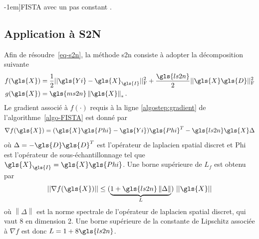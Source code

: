 \begin{algorithme}
    \begin{minipage}{\textwidth}
        \begin{algorithm}[H]
        \end{algorithm}
    \end{minipage}
    \caption[][-1em]{FISTA avec un pas constant \cite{beck_fast_2009}.\protect\label{algo-FISTA}}
\end{algorithme}

\subsection{Application à S2N}

Afin de résoudre~\eqref{eq-s2n}, la méthode \gls{s2n} consiste à adopter la décomposition suivante
\begin{align}
    f(\gls{X}) &= \frac{1}{2}\frobnorm{\gls{Yi}-\gls{X}_{\gls{I}}} + \frac{\gls{ls2n}}{2}\frobnorm{\gls{X} \gls{D}}\\
    g(\gls{X}) &= \gls{ms2n} \left\|\gls{X}\right\|_*.
\end{align}
Le gradient associé à $f(\cdot)$ requis à la ligne \ref{algostep:gradient} de l'algorithme~\ref{algo-FISTA} est donné par
\begin{equation}
    \label{nablaf-s2n}
    \nabla f(\gls{X}) = (\gls{X}\gls{Phi} - \gls{Yi})\gls{Phi}^T - \gls{ls2n} \gls{X} \Delta
\end{equation}
où $\Delta = -\gls{D}\gls{D}^T$ est l'opérateur de laplacien spatial discret et \gls{Phi} est l'opérateur de sous-échantillonnage tel que $\gls{X}_{\gls{I}} = \gls{X}\gls{Phi}$.
Une borne supérieure de $L_f$ est obtenu par
\begin{equation}
    ||\nabla f(\gls{X})||\leq (\underbrace{1+\gls{ls2n} \left\|\Delta\right\|}_{L})\ ||\gls{X}||
\end{equation}
où $\left\|\Delta\right\|$ est la norme spectrale de l'opérateur de laplacien spatial discret, qui vaut 8 en dimension 2. Une borne supérieure de la constante de Lipschitz associée à $\nabla f$ est donc $L= 1 +8\gls{ls2n}$. 

